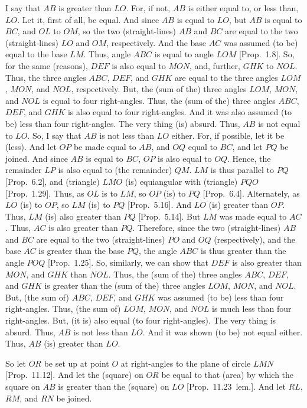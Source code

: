 \begin{Parallel}{}{}
{ I say that $AB$ is greater
than $LO$. For, if not, $AB$ is either equal to, or less than, $LO$.
Let it, first of all, be equal. And since $AB$ is equal to $LO$, but $AB$
is equal to $BC$, and $OL$ to $OM$, so the two (straight-lines)
$AB$ and $BC$ are equal to the two (straight-lines) $LO$ and $OM$, respectively. And the base $AC$ was assumed (to be) equal to the base
$LM$. Thus, angle $ABC$ is equal to angle $LOM$ [Prop.~1.8]. So, for the same (reasons), $DEF$ is also equal to $MON$,
and, further, $GHK$ to $NOL$. Thus, the three angles $ABC$, $DEF$,
and $GHK$ are equal to the three angles $LOM$, $MON$, and $NOL$,
respectively. But, the (sum of the) three angles $LOM$, $MON$,
and $NOL$ is equal to four right-angles. 
Thus, the (sum of the) three angles $ABC$, $DEF$, and $GHK$ is
also equal to four right-angles.
And it was also assumed (to be)
less than four right-angles. The very thing (is) absurd. Thus, $AB$
is not equal to $LO$. So, I say that $AB$ is not less than $LO$ either.
For, if possible, let it be (less). And let $OP$ be made equal to $AB$, and
$OQ$ equal to $BC$, and let $PQ$ be joined. And since $AB$ is equal
to $BC$, $OP$ is also equal to $OQ$. Hence, the remainder $LP$ is also
equal to (the remainder) $QM$. $LM$ is thus parallel to $PQ$ [Prop.~6.2], and (triangle) $LMO$ (is) equiangular with (triangle) $PQO$
[Prop.~1.29]. 
Thus, as $OL$ is to $LM$, so $OP$ (is) to $PQ$ [Prop.~6.4]. Alternately, as $LO$ (is) to $OP$, so $LM$ (is) to $PQ$
[Prop.~5.16]. And $LO$ (is) greater than $OP$. 
Thus, $LM$ (is) also greater than $PQ$ [Prop.~5.14]. 
But $LM$ was made equal to $AC$. Thus, $AC$ is also greater than $PQ$. Therefore, since the two
(straight-lines) $AB$ and $BC$ are equal
to the two (straight-lines) $PO$ and $OQ$ (respectively), and the base $AC$ is greater
than the base $PQ$, the angle $ABC$ is thus greater than the
angle $POQ$ [Prop.~1.25]. So, similarly,
we can show that $DEF$ is also greater than $MON$, and $GHK$ than
$NOL$. Thus, the (sum of the) three angles $ABC$, $DEF$, and
$GHK$ is greater than the (sum of the) three angles $LOM$, $MON$, and
$NOL$. But, (the sum of) $ABC$, $DEF$, and $GHK$ was assumed (to be)
less than four right-angles. Thus, (the sum of) $LOM$, $MON$, and
$NOL$ is much less than four right-angles. But, (it is) also equal (to four right-angles). The very thing is absurd. Thus, $AB$ is not less than $LO$.
And it was shown (to be) not equal either. Thus, $AB$ (is) greater  than
$LO$.

So let $OR$ be set up at point $O$ at right-angles to the plane
of circle $LMN$ [Prop.~11.12]. And let the (square) on $OR$ be equal to that (area) by which the square on $AB$ is greater than the
(square) on $LO$ [Prop.~11.23~lem.]. And let $RL$, $RM$, and $RN$ be joined.

}
\end{Parallel}
